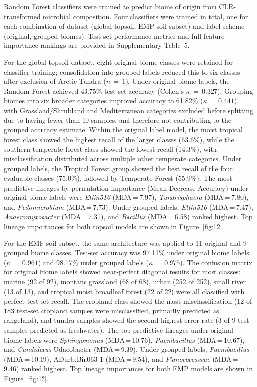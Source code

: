 \documentclass[12pt, oneside]{report}
\begin{document}
Random Forest classifiers were trained to predict biome of origin from CLR-transformed
microbial composition. Four classifiers were trained in total, one for each combination of
dataset (global topsoil, EMP soil subset) and label scheme (original, grouped biomes).
Test-set performance metrics and full feature importance rankings are provided in
Supplementary Table~5.

For the global topsoil dataset, eight original biome classes were retained for classifier
training; consolidation into grouped labels reduced this to six classes after exclusion of Arctic
Tundra ($n\,=\,1$). Under original biome labels, the Random Forest achieved 43.75\%
test-set accuracy (Cohen's $\kappa\,=\,0.327$). Grouping biomes into six broader categories
improved accuracy to 61.82\% ($\kappa\,=\,0.441$), with Grassland/Shrubland and
Mediterranean categories excluded before splitting due to having fewer than 10 samples, and
therefore not contributing to the grouped accuracy estimate. Within the original label model, the moist tropical forest class
showed the highest recall of the larger classes (63.6\%), while the southern temperate forest
class showed the lowest recall (14.3\%), with misclassification distributed across multiple
other temperate categories. Under grouped labels, the Tropical Forest group showed the best
recall of the four evaluable classes (75.0\%), followed by Temperate Forest (55.9\%). The most
predictive lineages by permutation importance (Mean Decrease Accuracy) under original biome labels were
\textit{Ellin516} (MDA\,=\,7.97), \textit{Tundrisphaera} (MDA\,=\,7.80), and
\textit{Pedomicrobium} (MDA\,=\,7.73). Under grouped labels, \textit{Ellin516}
(MDA\,=\,7.47), \textit{Anaeromyxobacter} (MDA\,=\,7.31), and \textit{Bacillus}
(MDA\,=\,6.58) ranked highest. Top lineage importances for both topsoil models are shown
in Figure~\ref{fig:12}.

For the EMP soil subset, the same architecture was applied to 11 original and 9 grouped
biome classes. Test-set accuracy was 97.11\% under original biome labels ($\kappa\,=\,0.961$) and 98.17\%
under grouped labels ($\kappa\,=\,0.975$). The confusion matrix for original biome labels
showed near-perfect diagonal results for most classes: marine (92 of 92), montane grassland
(68 of 68), urban (252 of 252), small river (13 of 13), and tropical moist broadleaf forest
(22 of 22) were all classified with perfect test-set recall. The cropland class showed the most
misclassification (12 of 183 test-set cropland samples were misclassified, primarily predicted as rangeland), and tundra samples
showed the second-highest error rate (3 of 9 test samples predicted as freshwater). The top
predictive lineages under original biome labels were \textit{Sphingomonas} (MDA\,=\,10.76),
\textit{Paenibacillus} (MDA\,=\,10.67), and \textit{Candidatus} Udaeobacter
(MDA\,=\,9.39). Under grouped labels, \textit{Paenibacillus} (MDA\,=\,10.19),
ADurb.Bin063-1 (MDA\,=\,9.54), and \textit{Planococcaceae} (MDA\,=\,9.46) ranked
highest. Top lineage importances for both EMP models are shown in Figure~\ref{fig:12}.
\end{document}
